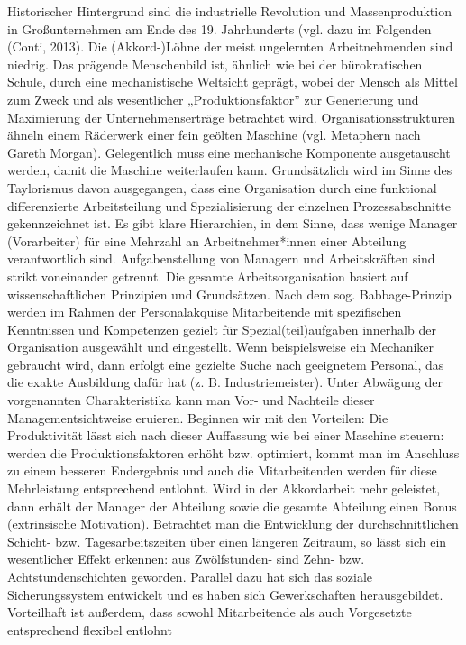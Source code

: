 \documentclass[
  letterpaper,
]{book}
\begin{document}
Historischer Hintergrund sind die industrielle Revolution und
Massenproduktion in Großunternehmen am Ende des 19. Jahrhunderts (vgl.
dazu im Folgenden (Conti, 2013). Die (Akkord-)Löhne der meist
ungelernten Arbeitnehmenden sind niedrig. Das prägende Menschenbild ist,
ähnlich wie bei der bürokratischen Schule, durch eine mechanistische
Weltsicht geprägt, wobei der Mensch als Mittel zum Zweck und als
wesentlicher „Produktionsfaktor'' zur Generierung und Maximierung der
Unternehmenserträge betrachtet wird. Organisationsstrukturen ähneln
einem Räderwerk einer fein geölten Maschine (vgl. Metaphern nach Gareth
Morgan). Gelegentlich muss eine mechanische Komponente ausgetauscht
werden, damit die Maschine weiterlaufen kann. Grundsätzlich wird im
Sinne des Taylorismus davon ausgegangen, dass eine Organisation durch
eine funktional differenzierte Arbeitsteilung und Spezialisierung der
einzelnen Prozessabschnitte gekennzeichnet ist. Es gibt klare
Hierarchien, in dem Sinne, dass wenige Manager (Vorarbeiter) für eine
Mehrzahl an Arbeitnehmer*innen einer Abteilung verantwortlich sind.
Aufgabenstellung von Managern und Arbeitskräften sind strikt voneinander
getrennt. Die gesamte Arbeitsorganisation basiert auf wissenschaftlichen
Prinzipien und Grundsätzen. Nach dem sog. Babbage-Prinzip werden im
Rahmen der Personalakquise Mitarbeitende mit spezifischen Kenntnissen
und Kompetenzen gezielt für Spezial(teil)aufgaben innerhalb der
Organisation ausgewählt und eingestellt. Wenn beispielsweise ein
Mechaniker gebraucht wird, dann erfolgt eine gezielte Suche nach
geeignetem Personal, das die exakte Ausbildung dafür hat (z. B.
Industriemeister). Unter Abwägung der vorgenannten Charakteristika kann
man Vor- und Nachteile dieser Managementsichtweise eruieren. Beginnen
wir mit den Vorteilen: Die Produktivität lässt sich nach dieser
Auffassung wie bei einer Maschine steuern: werden die
Produktionsfaktoren erhöht bzw. optimiert, kommt man im Anschluss zu
einem besseren Endergebnis und auch die Mitarbeitenden werden für diese
Mehrleistung entsprechend entlohnt. Wird in der Akkordarbeit mehr
geleistet, dann erhält der Manager der Abteilung sowie die gesamte
Abteilung einen Bonus (extrinsische Motivation). Betrachtet man die
Entwicklung der durchschnittlichen Schicht- bzw. Tagesarbeitszeiten über
einen längeren Zeitraum, so lässt sich ein wesentlicher Effekt erkennen:
aus Zwölfstunden- sind Zehn- bzw. Achtstundenschichten geworden.
Parallel dazu hat sich das soziale Sicherungssystem entwickelt und es
haben sich Gewerkschaften herausgebildet. Vorteilhaft ist außerdem, dass
sowohl Mitarbeitende als auch Vorgesetzte entsprechend flexibel entlohnt
\end{document}
